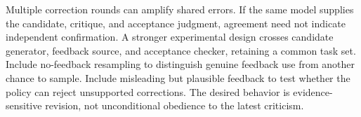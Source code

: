 Multiple correction rounds can amplify shared errors. If the same model supplies the candidate, critique, and acceptance judgment, agreement need not indicate independent confirmation. A stronger experimental design crosses candidate generator, feedback source, and acceptance checker, retaining a common task set. Include no-feedback resampling to distinguish genuine feedback use from another chance to sample. Include misleading but plausible feedback to test whether the policy can reject unsupported corrections. The desired behavior is evidence-sensitive revision, not unconditional obedience to the latest criticism.

